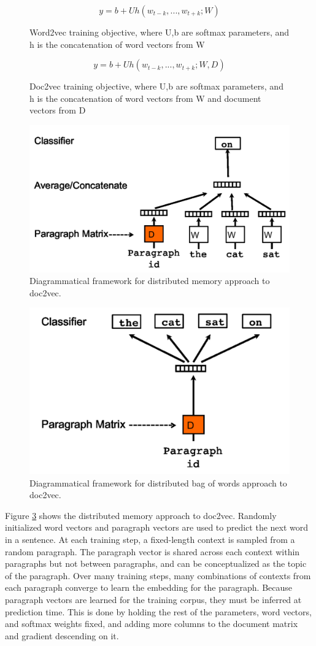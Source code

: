 \begin{figure}[h!]
    \centering
    $$y=b+Uh(w_{t-k}, ..., w_{t+k};W)$$
    \caption{Word2vec training objective, where U,b are softmax parameters, and h is the concatenation of word vectors from W}
    \label{fig:word2vec-obj}
\end{figure}

\begin{figure}[h!]
    \centering
    $$y=b+Uh(w_{t-k}, ..., w_{t+k};W,D)$$
    \caption{Doc2vec training objective, where U,b are softmax parameters, and h is the concatenation of word vectors from W and document vectors from D}
    \label{fig:doc2vec-obj}
\end{figure}

\begin{figure}[h!]
\centering
  \includegraphics[width=.5\linewidth]{files/doc2vec-2.png}
  \caption{Diagrammatical framework for distributed memory approach to doc2vec.}
  \label{fig:doc2vec2}
\end{figure}

\begin{figure}[h!]
\centering
  \includegraphics[width=.5\linewidth]{files/doc2vec-3.png}
  \caption{Diagrammatical framework for distributed bag of words approach to doc2vec.}
  \label{fig:doc2vec3}
\end{figure}

Figure \ref{fig:doc2vec2} shows the distributed memory approach to doc2vec. Randomly initialized word vectors and paragraph vectors are used to predict the next word in a sentence. At each training step, a fixed-length context is sampled from a random paragraph. The paragraph vector is shared across each context within paragraphs but not between paragraphs, and can be conceptualized as the topic of the paragraph. Over many training steps, many combinations of contexts from each paragraph converge to learn the embedding for the paragraph. Because paragraph vectors are learned for the training corpus, they must be inferred at prediction time. This is done by holding the rest of the parameters, word vectors, and softmax weights fixed, and adding more columns to the document matrix and gradient descending on it.

